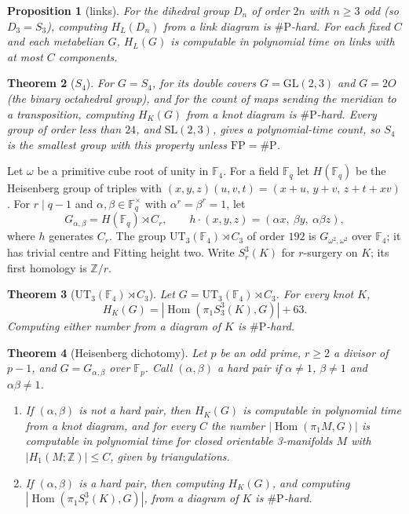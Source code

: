 \documentclass[11pt]{article}
\newtheorem{theorem}{Theorem}
\newtheorem{proposition}[theorem]{Proposition}
\theoremstyle{definition}
\theoremstyle{remark}
\newcommand{\F}{\mathbb{F}}
\newcommand{\Z}{\mathbb{Z}}
\newcommand{\Hom}{\operatorname{Hom}}
\newcommand{\sharpP}{\#\mathrm{P}}
\newcommand{\FP}{\mathrm{FP}}
\begin{document}
\begin{proposition}[links]\label{prop:links}
For the dihedral group $D_n$ of order $2n$ with $n\ge3$ odd (so $D_3=S_3$),
computing $H_L(D_n)$ from a link diagram is $\sharpP$-hard. For each fixed $C$
and each metabelian $G$, $H_L(G)$ is computable in polynomial time on links with
at most $C$ components.
\end{proposition}

\begin{theorem}[$S_4$]\label{thm:s4}
For $G=S_4$, for its double covers $G=\mathrm{GL}(2,3)$ and $G=2O$ (the binary
octahedral group), and for the count of maps sending the meridian to a
transposition, computing $H_K(G)$ from a knot diagram is $\sharpP$-hard.
Every group of order less than $24$, and $\mathrm{SL}(2,3)$, gives a
polynomial-time count, so $S_4$ is the smallest group with this property
unless $\FP=\sharpP$.
\end{theorem}

Let $\omega$ be a primitive cube root of unity in $\F_4$. For a field $\F_q$
let $H(\F_q)$ be the Heisenberg group of triples with
$(x,y,z)(u,v,t)=(x+u,\,y+v,\,z+t+xv)$. For $r\mid q-1$ and
$\alpha,\beta\in\F_q^\times$ with $\alpha^r=\beta^r=1$, let
\[
G_{\alpha,\beta}=H(\F_q)\rtimes C_r,\qquad h\cdot(x,y,z)=(\alpha x,\ \beta y,\
\alpha\beta z),
\]
where $h$ generates $C_r$. The group $\mathrm{UT}_3(\F_4)\rtimes C_3$ of order
$192$ is $G_{\omega^2,\omega^2}$ over $\F_4$; it has trivial centre and Fitting
height two. Write $S^3_r(K)$ for $r$-surgery on $K$; its first homology is
$\Z/r$.

\begin{theorem}[$\mathrm{UT}_3(\F_4)\rtimes C_3$]\label{thm:ut3}
Let $G=\mathrm{UT}_3(\F_4)\rtimes C_3$. For every knot $K$,
\[
H_K(G)=|\Hom(\pi_1S^3_3(K),G)|+63.
\]
Computing either number from a diagram of $K$ is $\sharpP$-hard.
\end{theorem}

\begin{theorem}[Heisenberg dichotomy]\label{thm:heis}
Let $p$ be an odd prime, $r\ge2$ a divisor of $p-1$, and $G=G_{\alpha,\beta}$
over $\F_p$. Call $(\alpha,\beta)$ a \emph{hard pair} if $\alpha\ne1$,
$\beta\ne1$ and $\alpha\beta\ne1$.
\begin{enumerate}
\item If $(\alpha,\beta)$ is not a hard pair, then $H_K(G)$ is computable in
polynomial time from a knot diagram, and for every $C$ the number
$|\Hom(\pi_1M,G)|$ is computable in polynomial time for closed orientable
3-manifolds $M$ with $|H_1(M;\Z)|\le C$, given by triangulations.
\item If $(\alpha,\beta)$ is a hard pair, then computing $H_K(G)$, and
computing $|\Hom(\pi_1S^3_r(K),G)|$, from a diagram of $K$ is $\sharpP$-hard.
\end{enumerate}
\end{theorem}
\end{document}

